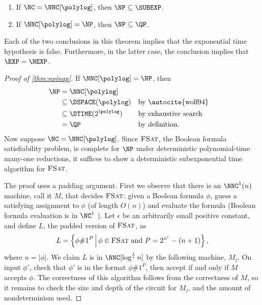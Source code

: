 \begin{theorem}\label{thm:npinqp}
  \mbox{}
  \begin{enumerate}
  \item If $\NC = \NNC[\polylog]$, then $\NP \subseteq \SUBEXP$.
  \item If $\NNC[\polylog] = \NP$, then $\NP \subseteq \QP$.
  \end{enumerate}
\end{theorem}
Each of the two conclusions in this theorem implies that the exponential time hypothesis is false.
Furthermore, in the latter case, the conclusion implies that $\EXP = \NEXP$.
\begin{proof}[Proof of \autoref{thm:npinqp}]
  If $\NNC[\polylog] = \NP$, then
  \begin{align*}
    \NP & = \NNC[\polylog] \\
        & \subseteq \DSPACE(\polylog) && \text{by \autocite{wolf94}} \\
        & \subseteq \DTIME(2^{\polylog}) && \text{by exhaustive search} \\
        & = \QP && \text{by definition}.
  \end{align*}
  Now suppose $\NC = \NNC[\polylog]$.
  Since $\textsc{FSat}$, the Boolean formula satisfiability problem, is complete for $\NP$ under deterministic polynomial-time many-one reductions, it suffices to show a deterministic subexponential time algorithm for $\textsc{FSat}$.

  The proof uses a padding argument.
  First we observe that there is an $\NNC^1(n)$ machine, call it $M$, that decides $\textsc{FSat}$: given a Boolean formula $\phi$, guess a satisfying assignment to $\phi$ (of length $O(n)$) and evaluate the formula (Boolean formula evaluation is in $\NC^1$ \autocite{buss87}).
  Let $\epsilon$ be an arbitrarily small positive constant, and define $L$, the padded version of $\textsc{FSat}$, as
  \begin{equation*}
    L = \left\{ \phi \# 1^P \, \middle| \, \phi \in \textsc{FSat} \text{ and } P = 2^{n^\epsilon} - (n + 1) \right\},
  \end{equation*}
  where $n = |\phi|$.
  We claim $L$ is in $\NNC[\log^\frac{1}{\epsilon} n]$ by the following machine, $M_j$.
  On input $\phi'$, check that $\phi'$ is in the format $\phi \# 1^P$, then accept if and only if $M$ accepts $\phi$.
  The correctness of this algorithm follows from the correctness of $M$, so it remains to check the size and depth of the circuit for $M_j$, and the amount of nondeterminism used.


\end{proof}
